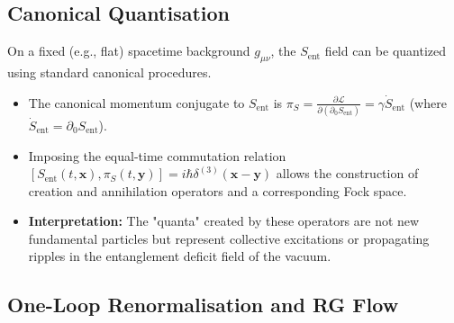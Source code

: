 \documentclass[11pt]{article}
\begin{document}
\subsection{Canonical Quantisation}

On a fixed (e.g., flat) spacetime background $g_{\mu\nu}$, the $S_{\mathrm{ent}}$ field can be quantized using standard canonical procedures.
\begin{itemize}
    \item The canonical momentum conjugate to $S_{\mathrm{ent}}$ is $\pi_S = \frac{\partial \mathcal{L}}{\partial (\partial_0 S_{\mathrm{ent}})} = \gamma \dot{S}_{\mathrm{ent}}$ (where $\dot{S}_{\mathrm{ent}} = \partial_0 S_{\mathrm{ent}}$).
    \item Imposing the equal-time commutation relation $[S_{\mathrm{ent}}(t, \mathbf{x}), \pi_S(t, \mathbf{y})] = i\hbar \delta^{(3)}(\mathbf{x}-\mathbf{y})$ allows the construction of creation and annihilation operators and a corresponding Fock space.
    \item \textbf{Interpretation:} The "quanta" created by these operators are not new fundamental particles but represent collective excitations or propagating ripples in the entanglement deficit field of the vacuum.
\end{itemize}

\subsection{One-Loop Renormalisation and RG Flow}
\end{document}
